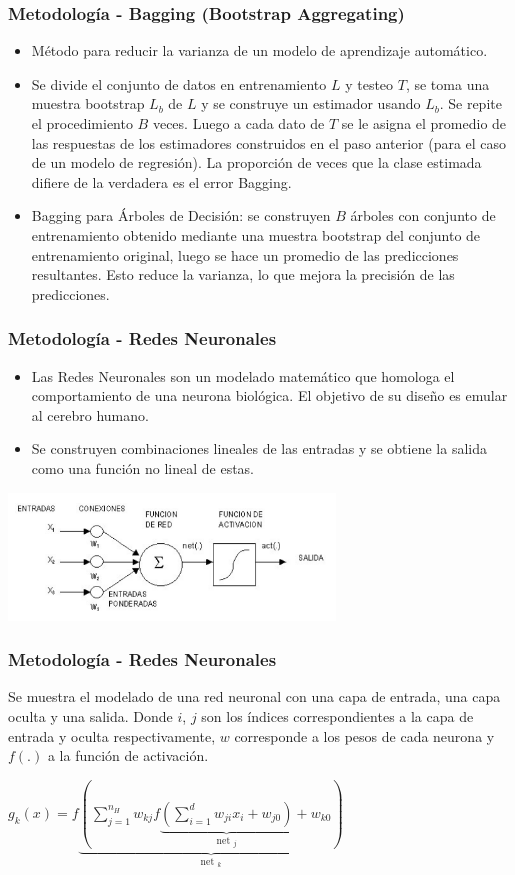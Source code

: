 \documentclass{beamer}
\begin{document}
\begin{frame}[t]
\frametitle{Metodología - Bagging (Bootstrap Aggregating)}

\vfill
\begin{itemize}
\item 
Método para reducir la varianza de un modelo de aprendizaje automático.
\item 
Se divide el conjunto de datos en entrenamiento $L$ y testeo $T$, se toma una muestra bootstrap $L_b$ de $L$ y se construye un estimador usando $L_b$. Se repite el procedimiento $B$ veces. Luego a cada dato de $T$ se le asigna el promedio de las respuestas de los estimadores construidos en el paso anterior (para el caso de un modelo de regresión). La proporción de veces que la clase estimada difiere de la verdadera es el error Bagging.
\item 
Bagging para Árboles de Decisión: se construyen $B$ árboles con conjunto de entrenamiento obtenido mediante una muestra bootstrap del conjunto de entrenamiento original, luego se hace un promedio de las predicciones resultantes. Esto reduce la varianza, lo que mejora la precisión de las predicciones.
\vfill
\end{itemize}

\end{frame}

\begin{frame}[t]
\frametitle{ Metodología - Redes Neuronales }
\vfill
\begin{itemize}
\item 
Las Redes Neuronales son un modelado matemático que homologa el comportamiento de una neurona biológica. El objetivo de su diseño es emular al cerebro humano.   
\item
Se construyen combinaciones lineales de las entradas y se obtiene la salida como una función no lineal de estas. 
\end{itemize}
\centering
\includegraphics[width=0.65\textwidth]{redNeuronal}
\vfill
\end{frame}

\begin{frame}[t]
\frametitle{ Metodología - Redes Neuronales }
\vfill

Se muestra el modelado de una red neuronal con una capa de entrada, una capa oculta y una salida. Donde $i$, $j$ son los índices correspondientes a la capa de entrada y oculta respectivamente, $w$ corresponde a los pesos de cada neurona y $f(.)$ a la función de activación.

\begin{block}{}
\centering
$g_{k}(x)=f \underbrace{(\sum_{j=1}^{n_{H}} w_{k j} f \underbrace{\left(\sum_{i=1}^{d} w_{j i} x_{i}+w_{j 0}\right)}_{\text {net }_{j}}+w_{k 0})}_{\text {net }_{k}}$
\end{block}
\vfill
\end{frame}
\end{document}
